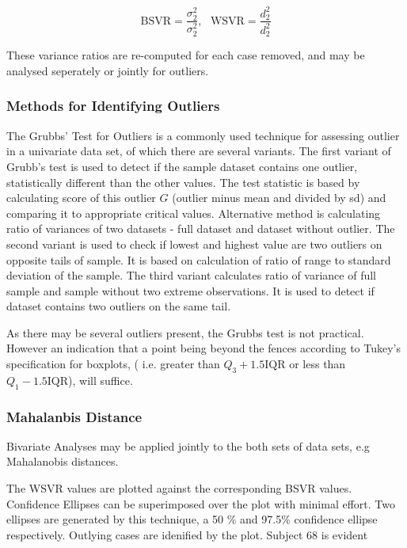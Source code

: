 \documentclass[12pt, a4paper]{report}
\theoremstyle{plain}
\theoremstyle{definition}
\theoremstyle{remark}
\begin{document}
	
	\[ \mbox{BSVR} = \frac{\sigma^2_2}{\sigma^2_2} , \mbox{   } \mbox{WSVR} = \frac{d^2_2}{d^2_2} \]
	
	These variance ratios are re-computed for each case removed, and may be analysed seperately or jointly for outliers.
	
	\subsubsection{Methods for Identifying Outliers}
	The Grubbs' Test for Outliers is a commonly used technique for assessing outlier in a univariate data set, of which there are several variants. The first variant of Grubb's test is used to detect if the sample dataset contains one outlier, statistically different than
	the other values. The test statistic is based by calculating score of this outlier $G$ (outlier minus mean and divided
	by sd) and comparing it to appropriate critical values. Alternative method is calculating ratio of
	variances of two datasets - full dataset and dataset without outlier. 
	The second variant is used to check if lowest and highest value are two outliers on opposite tails of
	sample. It is based on calculation of ratio of range to standard deviation of the sample.
	The third variant calculates ratio of variance of full sample and sample without two extreme observations.
	It is used to detect if dataset contains two outliers on the same tail.
	
	As there may be several outliers present, the Grubbs test is not practical. However an indication that a point being beyond the fences according to Tukey's 
	specification for boxplots, ( i.e. greater than $Q_3 +1.5 \mbox{IQR}$ or less than $Q_1 - 1.5 \mbox{IQR}$), will suffice.
	
	\subsubsection{Mahalanbis Distance}
	Bivariate Analyses may be applied jointly to the both sets of data sets, e.g Mahalanobis distances.
	
	The WSVR values are plotted against the corresponding BSVR values. Confidence Ellipses can be superimposed over the plot with minimal effort. Two ellipses are generated by this technique, a 50 \% and 97.5\% confidence ellipse respectively. Outlying cases are idenified by the plot. Subject 68 is evident
	
\end{document}
